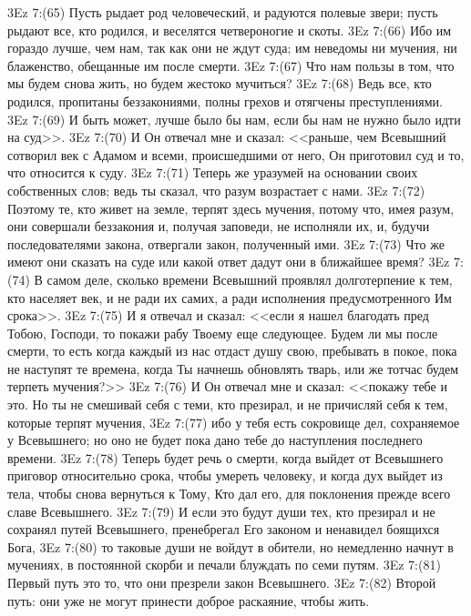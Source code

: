 \vs 3Ez 7:(65) Пусть рыдает род человеческий, и радуются полевые звери; пусть рыдают все, кто родился, и веселятся четвероногие и скоты.
\vs 3Ez 7:(66) Ибо им гораздо лучше, чем нам, так как они не ждут суда; им неведомы ни мучения, ни блаженство, обещанные им после смерти.
\vs 3Ez 7:(67) Что нам пользы в том, что мы будем снова жить, но будем жестоко мучиться?
\vs 3Ez 7:(68) Ведь все, кто родился, пропитаны беззакониями, полны грехов и отягчены преступлениями.
\vs 3Ez 7:(69) И быть может, лучше было бы нам, если бы нам не нужно было идти на суд>>.
\vs 3Ez 7:(70) И Он отвечал мне и сказал: <<раньше, чем Всевышний сотворил век с Адамом и всеми, происшедшими от него, Он приготовил суд и то, что относится к суду.
\vs 3Ez 7:(71) Теперь же уразумей на основании своих собственных слов; ведь ты сказал, что разум возрастает с нами.
\vs 3Ez 7:(72) Поэтому те, кто живет на земле, терпят здесь мучения, потому что, имея разум, они совершали беззакония и, получая заповеди, не исполняли их, и, будучи последователями закона, отвергали закон, полученный ими.
\vs 3Ez 7:(73) Что же имеют они сказать на суде или какой ответ дадут они в ближайшее время?
\vs 3Ez 7:(74) В самом деле, сколько времени Всевышний проявлял долготерпение к тем, кто населяет век, и не ради их самих, а ради исполнения предусмотренного Им срока>>.
\vs 3Ez 7:(75) И я отвечал и сказал: <<если я нашел благодать пред Тобою, Господи, то покажи рабу Твоему еще следующее. Будем ли мы после смерти, то есть когда каждый из нас отдаст душу свою, пребывать в покое, пока не наступят те времена, когда Ты начнешь обновлять тварь, или же тотчас будем терпеть мучения?>>
\vs 3Ez 7:(76) И Он отвечал мне и сказал: <<покажу тебе и это. Но ты не смешивай себя с теми, кто презирал, и не причисляй себя к тем, которые терпят мучения,
\vs 3Ez 7:(77) ибо у тебя есть сокровище дел, сохраняемое у Всевышнего; но оно не будет пока дано тебе до наступления последнего времени.
\vs 3Ez 7:(78) Теперь будет речь о смерти, когда выйдет от Всевышнего приговор относительно срока, чтобы умереть человеку, и когда дух выйдет из тела, чтобы снова вернуться к Тому, Кто дал его, для поклонения прежде всего славе Всевышнего.
\vs 3Ez 7:(79) И если это будут души тех, кто презирал и не сохранял путей Всевышнего, пренебрегал Его законом и ненавидел боящихся Бога,
\vs 3Ez 7:(80) то таковые души не войдут в обители, но немедленно начнут в мучениях, в постоянной скорби и печали блуждать по семи путям.
\vs 3Ez 7:(81) Первый путь это то, что они презрели закон Всевышнего.
\vs 3Ez 7:(82) Второй путь: они уже не могут принести доброе раскаяние, чтобы жить.
